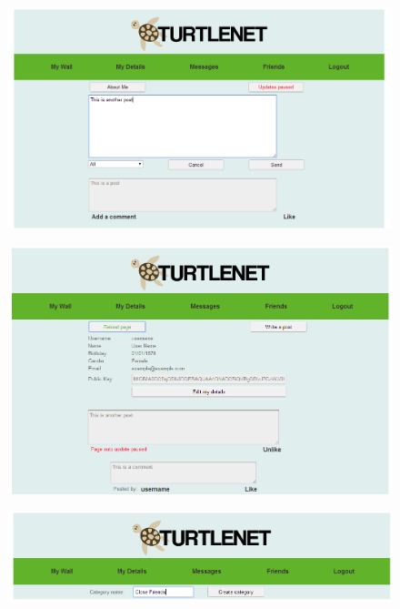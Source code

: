 \begin{figure}[h]
    \centering
    \includegraphics{images/screenshots/crop3.png}
\end{figure}

\begin{figure}[h]
    \centering
    \includegraphics{images/screenshots/crop4.png}
\end{figure}

\begin{figure}[h]
    \centering
    \includegraphics{images/screenshots/crop5.png}
\end{figure}

